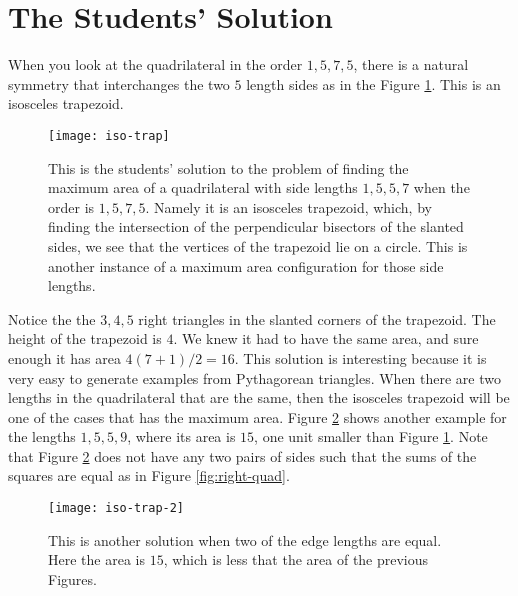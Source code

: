 \documentclass[11pt]{article}
\numberwithin{equation}{section}
\numberwithin{figure}{section}
\begin{document}
\section{The Students' Solution} \label{section:students}


When you look at the quadrilateral in the order $1, 5, 7, 5$, there is a natural symmetry that interchanges the two $5$ length sides as in the Figure \ref{fig:iso-trap}.  This is an isosceles trapezoid.

 \begin{figure}[!htb]
    \centering
        \texttt{[image: iso-trap]}%
        \captionsetup{labelsep=colon,margin=2cm}
         \caption{This is the students' solution to the problem of finding the maximum area of a quadrilateral with side lengths $1,5,5,7$ when the order is $1,5,7,5$.  Namely it is an isosceles trapezoid, which, by finding the intersection of the perpendicular bisectors of the slanted sides, we see that the vertices of the trapezoid lie on a circle. This is another instance of a maximum area configuration for those side lengths.}\label{fig:iso-trap}
    \end{figure}

Notice the the $3, 4, 5$ right triangles in the slanted corners of the trapezoid.  The height of the trapezoid is $4$.  We knew it had to have the same area, and sure enough it has area $4(7+1)/2=16$.  This solution is interesting because it is very easy to generate examples from Pythagorean triangles.  When there are two lengths in the quadrilateral that are the same, then the isosceles trapezoid will be one of the cases that has the maximum area.  Figure \ref{fig:iso-trap-2} shows another example for the lengths $1,5,5,9$, where its area is $15$, one unit smaller than Figure \ref{fig:iso-trap}. Note that Figure \ref{fig:iso-trap-2} does not have any two pairs of sides such that the sums of the squares are equal as in Figure \ref{fig:right-quad}.

 \begin{figure}[!htb]
    \centering
        \texttt{[image: iso-trap-2]}%
        \captionsetup{labelsep=colon,margin=2cm}
         \caption{This is another solution when two of the edge lengths are equal.  Here the area is $15$, which is less that the area of the previous Figures.}\label{fig:iso-trap-2}
    \end{figure}
    
\end{document}
